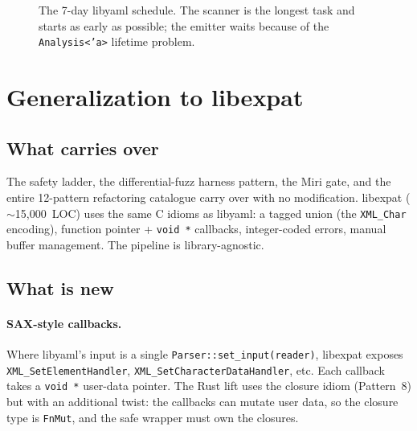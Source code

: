 \documentclass[12pt]{article}
\theoremstyle{definition}
\theoremstyle{remark}
\begin{document}
\begin{figure}[t]
\centering
{}
\caption{The 7-day libyaml schedule. The scanner is the longest task
and starts as early as possible; the emitter waits because of the
\texttt{Analysis<'a>} lifetime problem.}
\label{fig:gantt}
\end{figure}

\section{Generalization to libexpat}
\label{sec:libexpat}

\subsection{What carries over}

The safety ladder, the differential-fuzz harness pattern, the Miri
gate, and the entire 12-pattern refactoring catalogue carry over with
no modification. libexpat ($\sim$15{,}000~LOC) uses the same C idioms
as libyaml: a tagged union (the \texttt{XML\_Char} encoding), function
pointer + \texttt{void *} callbacks, integer-coded errors, manual
buffer management. The pipeline is library-agnostic.

\subsection{What is new}

\paragraph{SAX-style callbacks.} Where libyaml's input is a single
\texttt{Parser::set\_input(reader)}, libexpat exposes
\texttt{XML\_SetElementHandler}, \texttt{XML\_SetCharacterDataHandler},
etc. Each callback takes a \texttt{void *} user-data pointer. The Rust
lift uses the closure idiom (Pattern~8) but with an additional twist:
the callbacks can mutate user data, so the closure type is
\texttt{FnMut}, and the safe wrapper must own the closures.
\end{document}
